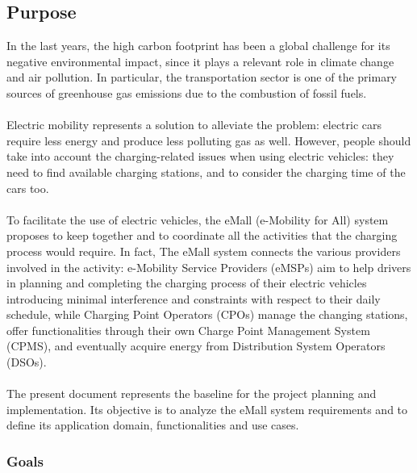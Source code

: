 \documentclass[../main.tex]{subfiles}
\begin{document}
\subsection{Purpose}

In the last years, the high carbon footprint has been a global challenge for its negative environmental impact, since it plays a relevant role in climate change and air pollution. In particular, the transportation sector is one of the primary sources of greenhouse gas emissions due to the combustion of fossil fuels.
\\
\\
Electric mobility represents a solution to alleviate the problem: electric cars require less energy and produce less polluting gas as well. However, people should take into account the charging-related issues when using electric vehicles: they need to find available charging stations, and to consider the charging time of the cars too.
\\
\\
To facilitate the use of electric vehicles, the eMall (e-Mobility for All) system proposes to keep together and to coordinate all the activities that the charging process would require. In fact, The eMall system connects the various providers involved in the activity: e-Mobility Service Providers (eMSPs) aim to help drivers in planning and completing the charging process of their electric vehicles introducing minimal interference and constraints with respect to their daily schedule, while Charging Point Operators (CPOs) manage the changing stations, offer functionalities through their own Charge Point Management System (CPMS), and eventually acquire energy from Distribution System Operators (DSOs).
\\
\\
The present document represents the baseline for the project planning and implementation. Its objective is to analyze the eMall system requirements and to define its application domain, functionalities and use cases. 


\subsubsection{Goals}
\end{document}
